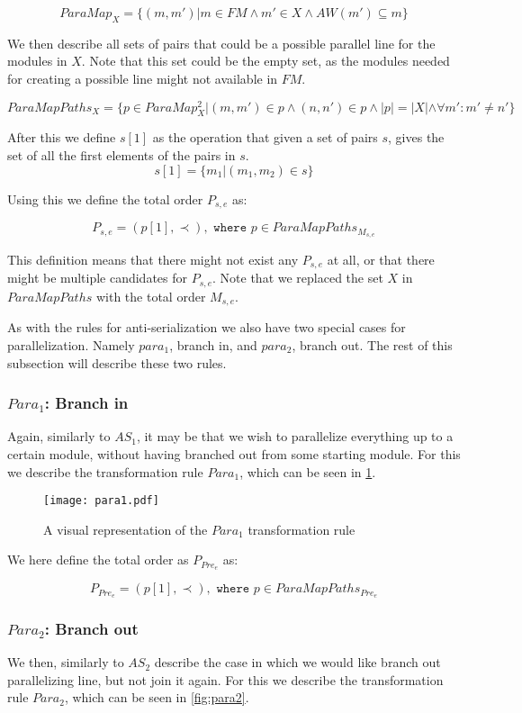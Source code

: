 \[ParaMap_{X} = \{(m, m')| m \in FM \land m' \in X \land AW(m') \subseteq m\} \]

We then describe all sets of pairs that could be a possible parallel line for the modules in $X$. Note that this set could be the empty set, as the modules needed for creating a possible line might not available in $FM$.

\[ParaMapPaths_{X} = \{p \in ParaMap_{X}^2 | (m,m') \in p \land (n,n') \in p \land |p| = |X| \land  \forall m': m' \neq n' \}\]

After this we define $s[1]$ as the operation that given a set of pairs $s$, gives the set of all the first elements of the pairs in $s$.
\[s[1] = \{m_1 | (m_1, m_2) \in s\}\]

Using this we define the total order $P_{s,e}$ as:

\[ P_{s,e} = (p[1], \prec), \texttt{ where } p \in ParaMapPaths_{M_{s,e}} \]

This definition means that there might not exist any $P_{s,e}$ at all, or that there might be multiple candidates for $P_{s,e}$. Note that we replaced the set $X$ in $ParaMapPaths$ with the total order $M_{s,e}$.

As with the rules for anti-serialization we also have two special cases for parallelization. Namely $para_1$, branch in, and $para_2$, branch out. The rest of this subsection will describe these two rules.

\subsubsection{$Para_1$: Branch in}
Again, similarly to $AS_1$, it may be that we wish to parallelize everything up to a certain module, without having branched out from some starting module. For this we describe the transformation rule $Para_1$, which can be seen in \cref{fig:para1}.

\begin{figure}[H]
	\centering
	\texttt{[image: para1.pdf]}
	\caption{A visual representation of the $Para_1$ transformation rule}
	\label{fig:para1}
\end{figure}

We here define the total order as $P_{Pre_e}$ as:

\[P_{Pre_e} = (p[1], \prec), \texttt{ where } p \in ParaMapPaths_{Pre_e} \]

\subsubsection{$Para_2$: Branch out}
We then, similarly to $AS_2$ describe the case in which we would like branch out parallelizing line, but not join it again. For this we describe the transformation rule $Para_2$, which can be seen in \cref{fig:para2}.

